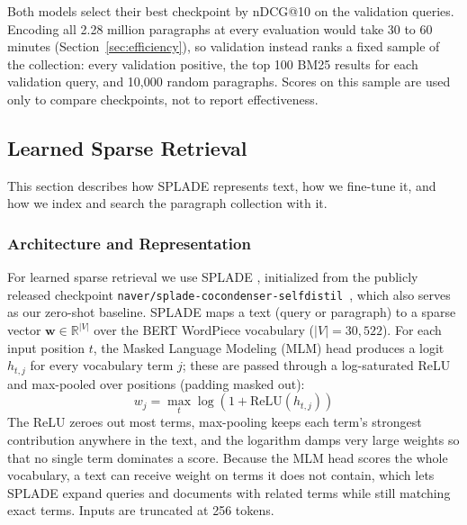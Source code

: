 \documentclass[sigconf,nonacm]{acmart}
\begin{document}
Both models select their best checkpoint by nDCG@10 on the validation queries. Encoding 
all 2.28 million paragraphs at every evaluation would take 30 to 60 minutes (Section~\ref{sec:efficiency}), 
so validation instead ranks a fixed sample of the collection: every validation positive, 
the top 100 BM25 results for each validation query, and 10,000 random paragraphs. Scores 
on this sample are used only to compare checkpoints, not to report effectiveness.

\subsection{Learned Sparse Retrieval}
\label{sec:splade}
This section describes how SPLADE represents text, how we fine-tune it, and how 
we index and search the paragraph collection with it.

\subsubsection{Architecture and Representation}
For learned sparse retrieval we use SPLADE \cite{formal2021splade}, initialized from
the publicly released checkpoint \texttt{naver/\allowbreak splade-\allowbreak cocondenser-\allowbreak selfdistil}~\cite{formal2022distillation},
which also serves as our zero-shot baseline. SPLADE maps a text (query or paragraph) to a
sparse vector $\mathbf{w} \in \mathbb{R}^{|V|}$ over the BERT WordPiece vocabulary
($|V| = 30{,}522$). For each input position $t$, the Masked Language Modeling (MLM) head
produces a logit $h_{t,j}$ for every vocabulary term $j$; these are passed through a
log-saturated ReLU and max-pooled over positions (padding masked out):
\begin{equation}
    w_j = \max_{t} \log \left( 1 + \mathrm{ReLU}(h_{t,j}) \right)
\end{equation}
The ReLU zeroes out most terms, max-pooling keeps each term's strongest contribution
anywhere in the text, and the logarithm damps very large weights so that no single term
dominates a score. Because the MLM head scores the whole vocabulary, a text can receive
weight on terms it does not contain, which lets SPLADE expand queries and documents with
related terms while still matching exact terms. Inputs are truncated at 256 tokens.
\end{document}
